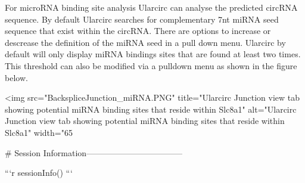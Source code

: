 For microRNA binding site analysis Ularcirc can analyse the predicted circRNA sequence. By default Ularcirc searches for complementary 7nt miRNA seed sequence that exist within the circRNA. There are options to increase or descrease the definition of the miRNA seed in a pull down menu. Ularcirc by default will only display miRNA bindings sites that are found at least two times. This threshold can also be modified via a pulldown menu as shown in the figure below. 

<img src="BackspliceJunction_miRNA.PNG" title="Ularcirc Junction view tab showing potential miRNA binding sites that reside within Slc8a1" alt="Ularcirc Junction view tab showing potential miRNA binding sites that reside within Slc8a1" width="65%


# Session Information-----------------------------------


```r
sessionInfo()
```

